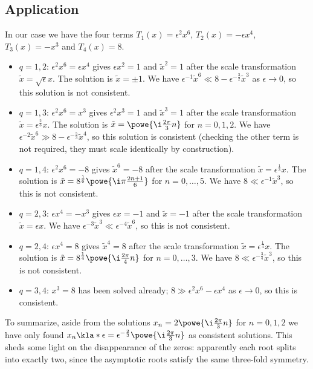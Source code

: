 \documentclass[english, parskip=full]{scrartcl}
\begin{document}
\subsection{Application}
In our case we have the four terms $T_1(x) = \epsilon^2 x^6$, $T_2(x) = -\epsilon x^4$, $T_3(x) = -x^3$ and $T_4(x)=8$.
\begin{itemize}
\item $q=1,2$: $\epsilon^2 x^6 = \epsilon x^4$ gives $\epsilon x^2 = 1$ and $\tilde{x}^2 = 1$ after the scale transformation $\tilde{x} = \sqrt{\epsilon} x$. The solution is $\tilde{x} = \pm 1$. We have $\epsilon^{-1} \tilde{x}^6 \ll 8-\epsilon^{-\frac{3}{2}} \tilde{x}^3$ as $\epsilon\rightarrow 0$, so this solution is not consistent.
\item $q=1,3$: $\epsilon^2 x^6 = x^3$ gives $\epsilon^2 x^3 = 1$ and $\tilde{x}^3=1$ after the scale transformation $\tilde{x} = \epsilon^\frac{2}{3} x$. The solution is $\tilde{x} = \powe{\i \frac{2\pi}{3} n}$ for $n=0,1,2$. We have $\epsilon^{-2} \tilde{x}^6 \gg 8 - \epsilon^{-\frac{5}{3}} \tilde{x}^4$, so this solution is consistent (checking the other term is not required, they must scale identically by construction).
\item $q=1,4$: $\epsilon^2 x^6 = -8$ gives $\tilde{x}^6 = -8$ after the scale transformation $\tilde{x} = \epsilon^\frac{1}{3} x$. The solution is $\tilde{x} = 8^\frac{1}{6} \powe{\i \pi \frac{2n+1}{6}}$ for $n=0,\dots,5$. We have $8 \ll \epsilon^{-1} \tilde{x}^3$, so this is not consistent.
\item $q=2,3$: $\epsilon x^4 = -x^3$ gives $\epsilon x = -1$ and $\tilde{x} = -1$ after the scale transformation $\tilde{x} = \epsilon x$. We have $\epsilon^{-3} \tilde{x}^3 \ll \epsilon^{-4} \tilde{x}^6$, so this is not consistent.
\item $q=2,4$: $\epsilon x^4 = 8$ gives $\tilde{x}^4 = 8$ after the scale transformation $\tilde{x} = \epsilon^\frac{1}{4} x$. The solution is $\tilde{x} = 8^\frac{1}{4} \powe{\i \frac{2\pi}{4} n}$ for $n=0,\dots,3$. We have $8 \ll \epsilon^{-\frac{3}{4}} \tilde{x}^3$, so this is not consistent.
\item $q=3,4$: $x^3=8$ has been solved already; $8 \gg \epsilon^2 x^6 - \epsilon x^4$ as $\epsilon\rightarrow 0$, so this is consistent.
\end{itemize}
To summarize, aside from the solutions $x_n = 2\powe{\i \frac{2\pi}{3} n}$ for $n=0,1,2$ we have only found $x_n\kla*{\epsilon} = \epsilon^{-\frac{2}{3}} \powe{\i \frac{2\pi}{3}n}$ as consistent solutions.
This sheds some light on the disappearance of the zeros: apparently each root splits into exactly two, since the asymptotic roots satisfy the same three-fold symmetry.
\end{document}
